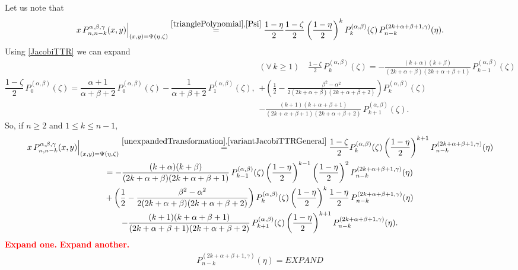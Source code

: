 \documentclass{article}
\numberwithin{equation}{section}
\numberwithin{figure}{section}
\begin{document}
Let us note that
%
\begin{equation}\label{unexpandedTransformation}
\left. x \, P^{\alpha,\beta,\gamma}_{n,n-k}(x,y) \right|_{(x,y) = \Psi(\eta,\zeta)}
\stackrel{\eqref{trianglePolynomial},\eqref{Psi}}{=} \frac{1-\eta}{2} \frac{1-\zeta}{2} \left(\frac{1-\eta}{2}\right)^k P^{(\alpha,\beta)}_k(\zeta) \, P^{(2k+\alpha+\beta+1,\gamma)}_{n-k}(\eta).
\end{equation}
%
Using \eqref{JacobiTTR} we can expand
%
\begin{subequations}
\begin{equation}\label{variantJacobiTTRFirst}
\frac{1-\zeta}{2} \, P^{(\alpha,\beta)}_0(\zeta) = \frac{\alpha+1}{\alpha+\beta+2} \, P^{(\alpha,\beta)}_0(\zeta) - \frac{1}{\alpha+\beta+2} \, P^{(\alpha,\beta)}_1(\zeta),
\end{equation}
\begin{multline}\label{variantJacobiTTRGeneral}
(\forall\,k\geq 1) \quad \frac{1-\zeta}{2} \, P^{(\alpha,\beta)}_k(\zeta)
= -\frac{(k+\alpha)(k+\beta)}{(2k+\alpha+\beta)(2k+\alpha+\beta+1)} \, P^{(\alpha,\beta)}_{k-1}(\zeta)\\
+ \left( \frac{1}{2} - \frac{\beta^2-\alpha^2}{2(2k+\alpha+\beta)(2k+\alpha+\beta+2)} \right) P^{(\alpha,\beta)}_k(\zeta)\\
- \frac{(k+1)(k+\alpha+\beta+1)}{(2k+\alpha+\beta+1)(2k+\alpha+\beta+2)} \, P^{(\alpha,\beta)}_{k+1}(\zeta).
\end{multline}
\end{subequations}
%
So, if $n \geq 2$ and $1 \leq k \leq n-1$,
%
\begin{multline*}
\left. x \, P^{\alpha,\beta,\gamma}_{n,n-k}(x,y) \right|_{(x,y) = \Psi(\eta,\zeta)}
\stackrel{\eqref{unexpandedTransformation},\eqref{variantJacobiTTRGeneral}}{=} \frac{1-\zeta}{2} P^{(\alpha,\beta)}_k(\zeta) \left(\frac{1-\eta}{2}\right)^{k+1} P^{(2k+\alpha+\beta+1,\gamma)}_{n-k}(\eta)\\
= -\frac{(k+\alpha)(k+\beta)}{(2k+\alpha+\beta)(2k+\alpha+\beta+1)} \, P^{(\alpha,\beta)}_{k-1}(\zeta) \left(\frac{1-\eta}{2}\right)^{k-1} \left(\frac{1-\eta}{2}\right)^2 P^{(2k+\alpha+\beta+1,\gamma)}_{n-k}(\eta)\\
+ \left( \frac{1}{2} - \frac{\beta^2-\alpha^2}{2(2k+\alpha+\beta)(2k+\alpha+\beta+2)} \right) P^{(\alpha,\beta)}_k(\zeta) \left(\frac{1-\eta}{2}\right)^k \frac{1-\eta}{2} \, P^{(2k+\alpha+\beta+1,\gamma)}_{n-k}(\eta)\\
- \frac{(k+1)(k+\alpha+\beta+1)}{(2k+\alpha+\beta+1)(2k+\alpha+\beta+2)} \, P^{(\alpha,\beta)}_{k+1}(\zeta) \left(\frac{1-\eta}{2}\right)^{k+1} P^{(2k+\alpha+\beta+1,\gamma)}_{n-k}(\eta).
\end{multline*}
%
\textcolor{red}{\textbf{Expand one.}}
\textcolor{red}{\textbf{Expand another.}}
%
\begin{multline*}
P^{(2k+\alpha+\beta+1,\gamma)}_{n-k}(\eta) = EXPAND
\end{multline*}
%
\end{document}
